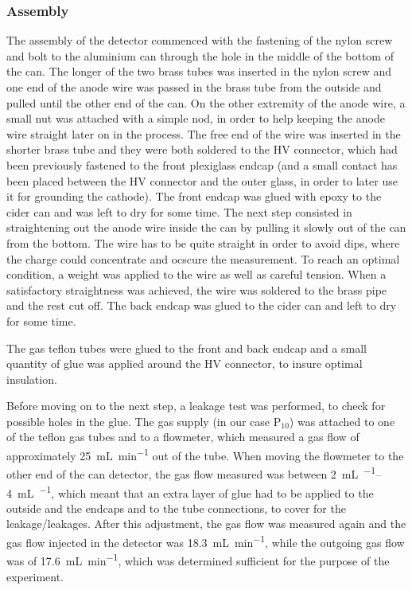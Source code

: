 \subsubsection{Assembly}

The assembly of the detector commenced with the fastening of the nylon screw and
bolt to the aluminium can through the hole in the middle of the bottom of the
can. The longer of the two brass tubes was inserted in the nylon screw and one
end of the anode wire was passed in the brass tube from the outside and pulled
until the other end of the can. On the other extremity of the anode wire, a
small nut was attached with a simple nod, in order to help keeping the anode
wire straight later on in the process. The free end of the wire was inserted in
the shorter brass tube and they were both soldered to the HV connector, which
had been previously fastened to the front plexiglass endcap (and a small contact
has been placed between the HV connector and the outer glass, in order to later
use it for grounding the cathode). The front endcap was glued with epoxy to the
cider can and was left to dry for some time. The next step consisted in
straightening out the anode wire inside the can by pulling it slowly out of the
can from the bottom. The wire has to be quite straight in order to avoid dips,
where the charge could concentrate and ocscure the measurement. To reach an
optimal condition, a weight was applied to the wire as well as careful tension.
When a satisfactory straightness was achieved, the wire was soldered to the
brass pipe and the rest cut off. The back endcap was glued to the cider can and
left to dry for some time.

The gas teflon tubes were glued to the front and back endcap and a small
quantity of glue was applied around the HV connector, to insure optimal
insulation.

Before moving on to the next step, a leakage test was performed, to check for
possible holes in the glue. The gas supply (in our case $\mathrm{P}_{10}$) was
attached to one of the teflon gas tubes and to a flowmeter, which measured a gas
flow of approximately \SI{25}{\milli\liter\per\minute} out of the tube. When
moving the flowmeter to the other end of the can detector, the gas flow measured
was between \SIrange{2}{4}{\milli\liter\per\min}, which meant that an extra layer
of glue had to be applied to the outside and the endcaps and to the tube
connections, to cover for the leakage/leakages. After this adjustment, the gas
flow was measured again and the gas flow injected in the detector was
\SI{18.3}{\milli\liter\per\minute}, while the outgoing gas flow was of
\SI{17.6}{\milli\liter\per\minute}, which was determined sufficient for the
purpose of the experiment.

